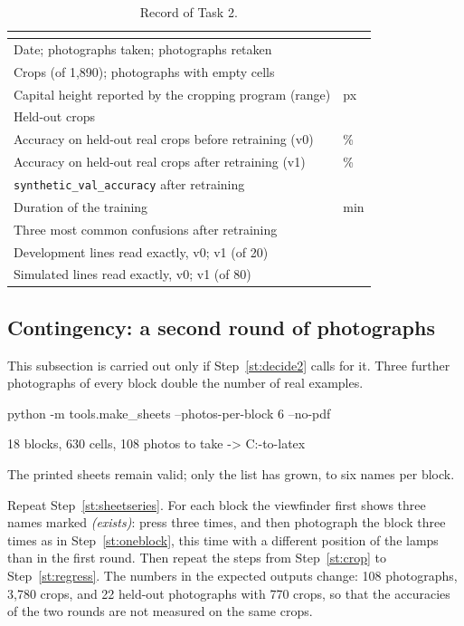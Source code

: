 \begin{table}[H]
\centering
\begin{tabular}{L{7.4cm}C{3.8cm}}
\toprule
{} &  \\
\midrule
Date; photographs taken; photographs retaken & \\
Crops (of 1{,}890); photographs with empty cells & \\
Capital height reported by the cropping program (range) & \hfill px \\
Held-out crops & \\
Accuracy on held-out real crops before retraining (v0) & \hfill \% \\
Accuracy on held-out real crops after retraining (v1) & \hfill \% \\
\texttt{synthetic\_val\_accuracy} after retraining & \\
Duration of the training & \hfill min \\
Three most common confusions after retraining & \\
Development lines read exactly, v0; v1 (of 20) & \\
Simulated lines read exactly, v0; v1 (of 80) & \\
\bottomrule
\end{tabular}
\caption{Record of Task 2.}
\label{tab:t2record}
\end{table}

\subsection{Contingency: a second round of photographs}
\label{sec:round2}

This subsection is carried out only if Step~\ref{st:decide2} calls for it. Three further
photographs of every block double the number of real examples.

\begin{ps}
python -m tools.make_sheets --photos-per-block 6 --no-pdf
\end{ps}
\begin{out}
18 blocks, 630 cells, 108 photos to take -> C:\camera-to-latex\sheets
\end{out}
The printed sheets remain valid; only the list  has grown, to
six names per block.

Repeat Step~\ref{st:sheetseries}. For each block the viewfinder first shows three names marked
\emph{(exists)}: press  three times, and then photograph the block three times as in
Step~\ref{st:oneblock}, this time with a different position of the lamps than in the first
round. Then repeat the steps from Step~\ref{st:crop} to Step~\ref{st:regress}. The numbers in
the expected outputs change: 108 photographs, 3{,}780 crops, and 22 held-out photographs with
770 crops, so that the accuracies of the two rounds are not measured on the same crops.


